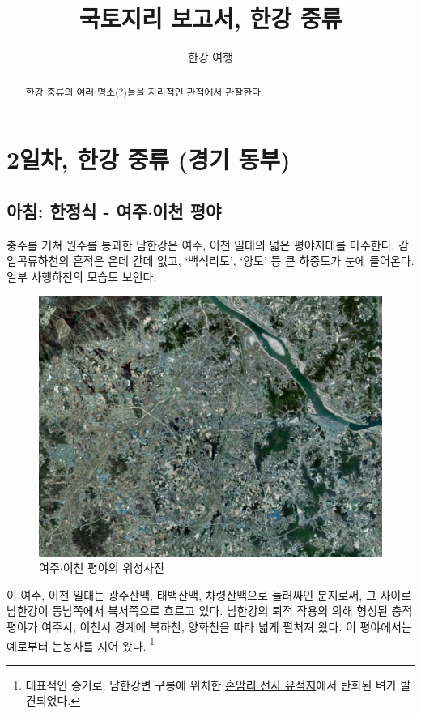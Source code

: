 \documentclass[chapter, oneside]{oblivoir}
\title{국토지리 보고서, 한강 중류}
\author{한강 여행}
\begin{document}
\maketitle
\begin{abstract}
한강 중류의 여러 명소(?)들을 지리적인 관점에서 관찰한다.
\end{abstract}

\newpage
\tableofcontents

\chapter{2일차, 한강 중류 (경기 동부)}
\section{아침: 한정식 - 여주$\cdot$이천 평야}
충주를 거쳐 원주를 통과한 남한강은 여주, 이천 일대의 넓은 평야지대를 마주한다. 
감입곡류하천의 흔적은 온데 간데 없고, ‘백석리도’, ‘양도’ 등 큰 하중도가 눈에 들어온다.
일부 사행하천의 모습도 보인다.

\begin{figure}
    \centering
    \includegraphics[width=.8\textwidth]{img/여주이천평야.PNG}
    \caption{여주$\cdot$이천 평야의 위성사진\protect\footnotemark}
    \label{fig:my_label}
\end{figure}


이 여주, 이천 일대는 
광주산맥, 태백산맥, 차령산맥으로 둘러싸인 분지로써,
그 사이로 남한강이 동남쪽에서 북서쪽으로 흐르고 있다.
남한강의 퇴적 작용의 의해 형성된 충적평야가 여주시, 이천시 경계에 북하천, 양화천을 따라 넓게 펼처져 왔다.
이 평야에서는 예로부터 논농사를 지어 왔다.
\footnote{대표적인 증거로, 남한강변 구릉에 위치한 \href{https://terms.naver.com/entry.naver?docId=1793906&cid=49217&categoryId=49217}{혼암리 선사 유적지}에서 탄화된 벼가 발견되었다.}
\end{document}
